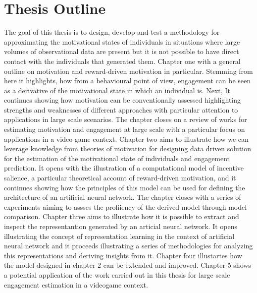 \section{Thesis Outline}
The goal of this thesis is to design, develop and test a methodology for approximating the motivational states of individuals in situations where large volumes of observational data are present but it is not possible to have direct contact with the individuals that generated them. Chapter one with a general outline on motivation and reward-driven motivation in particular. Stemming from here it highlights, how from a behavioural point of view, engagement can be seen as a derivative of the motivational state in which an individual is. Next, It continues showing how motivation can be conventionally assessed highlighting strengths and weaknesses of different approaches with particular attention to applications in large scale scenarios. The chapter closes on a review of works for estimating motivation and engagement at large scale with a particular focus on applications in a video game context. Chapter two aims to illustrate how we can leverage knowledge from theories of motivation for designing data driven solution for the estimation of the motivational state of individuals and engagement prediction. It opens with the illustration of a computational model of incentive salience, a particular theoretical account of reward-driven motivation, and it continues showing how the principles of this model can be used for defining the architecture of an artificial neural network. The chapter closes with a series of experiments aiming to assses the profiiency of the derived model through model comparison. Chapter three aims to illustrate how it is possible to extract and inspect the representantion generated by an articial neural network. It opens illustrating the concept of representation learning in the context of artificial neural network and it proceeds illustrating a series of methodologies for analyzing this representations and deriving insights from it. Chapter four illustartes how the model designed in chapter 2 can be extended and improved. Chapter 5 shows a potential application of the work carried out in this thesis for large scale engagement estimation in a videogame context.


